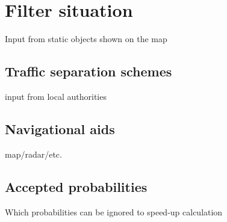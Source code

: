 \chapter{Filter situation}
Input from static objects shown on the map

\section{Traffic separation schemes}
input from local authorities

\section{Navigational aids}
map/radar/etc.

\section{Accepted probabilities}
Which probabilities can be ignored to speed-up calculation

